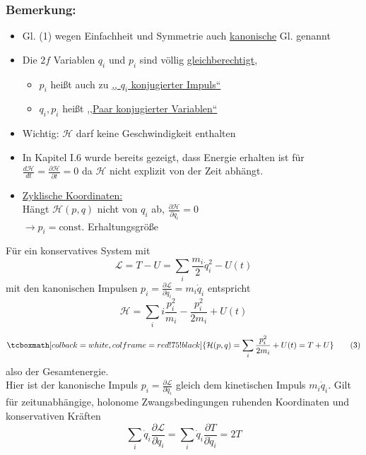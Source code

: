\documentclass[titlepage,12pt,a4paper,ngerman]{report}
\newcommand{\tx}[1]{\textrm{#1}}
\newcommand{\lag}{\mathcal{L}}
\newcommand{\ham}{\mathcal{H}}
\newcommand{\const}{\tx{const.}}
\newcommand{\rmbox}[1]{\tcboxmath[colback=white,colframe=red!75!black]{#1}} %
\begin{document}
{\subsubsection{Bemerkung:}
\begin{itemize}
	\item Gl. (1) wegen Einfachheit und Symmetrie auch \underline{kanonische} Gl. genannt
	\item  Die $2 f$ Variablen $ q_i $ und $ p_i $ sind völlig \underline{gleichberechtigt},
	\begin{itemize}
		\item $ p_i $ heißt auch zu \underline{,, $ q_i $ konjugierter Impuls``}
		\item $ q_i , p_i $ heißt \underline{,,Paar konjugierter Variablen``}
	\end{itemize}
	\item Wichtig: $ \ham $ darf keine Geschwindigkeit enthalten
	\item In Kapitel I.6 wurde bereits gezeigt, dass Energie erhalten ist für $ \frac{d\ham}{dt} = \frac{\partial \ham}{\partial t} = 0 $ da $ \ham $ nicht explizit von der Zeit abhängt.
	\item \underline{Zyklische Koordinaten:}\\
	Hängt $ \ham(p,q) $ nicht von $ q_i $ ab, $\frac{\partial \ham}{\partial q_i} = 0$\\
	$ \rightarrow p_i = \const $ Erhaltungsgröße
\end{itemize}
Für ein konservatives System mit
\begin{equation*}
\lag = T - U = \sum_i \frac{m_i}{2} \dot{q}_i^2 - U(t)
\end{equation*}
mit den kanonischen Impulsen $ p_i = \frac{\partial \lag}{\partial \dot{q}_i} = m_i \dot{q}_i $ entspricht
\begin{equation*}
\ham = \sum_ii \frac{p_i^2}{m_i} - \frac{p_i^2}{2 m_i} + U(t)
\end{equation*}
\begin{equation*}
\rmbox{\ham(p,q) = \sum_i^{\phantom{i}} \frac{p_i^2}{2 m_i} + U(t) = T + U } \tag{3}
\end{equation*}
also der Gesamtenergie.\\
Hier ist der kanonische Impuls $ p_i = \frac{\partial \lag}{\partial \dot{q}_i} $ gleich dem kinetischen Impuls $ m_i \dot{q}_i $. Gilt für zeitunabhängige, holonome Zwangsbedingungen ruhenden Koordinaten und konservativen Kräften
\begin{equation*}
\sum_i \dot{q}_i \frac{\partial \lag}{\partial \dot{q}_i} = \sum_i \dot{q}_i \frac{\partial T}{\partial \dot{q}_i} = 2 T

\end{equation*}}
\end{document}
